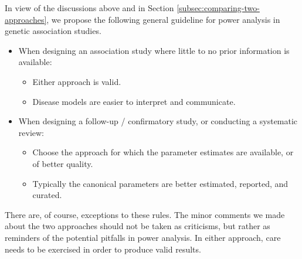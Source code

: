 In view of the discussions above and in Section \ref{subsec:comparing-two-approaches}, we propose the following general guideline for power analysis in genetic association studies.

\begin{itemize}
    \item When designing an association study where little to no prior information is available: 
    \begin{itemize}
        \item Either approach is valid.
        \item Disease models are easier to interpret and communicate.
    \end{itemize}
    \item When designing a follow-up / confirmatory study, or conducting a systematic review:
    \begin{itemize}
        \item Choose the approach for which the parameter estimates are available, or of better quality.
        \item Typically the canonical parameters are better estimated, reported, and curated.
    \end{itemize}
\end{itemize}
There are, of course, exceptions to these rules.
The minor comments we made about the two approaches should not be taken as criticisms, but rather as reminders of the potential pitfalls in power analysis.
In either approach, care needs to be exercised in order to produce valid results.

